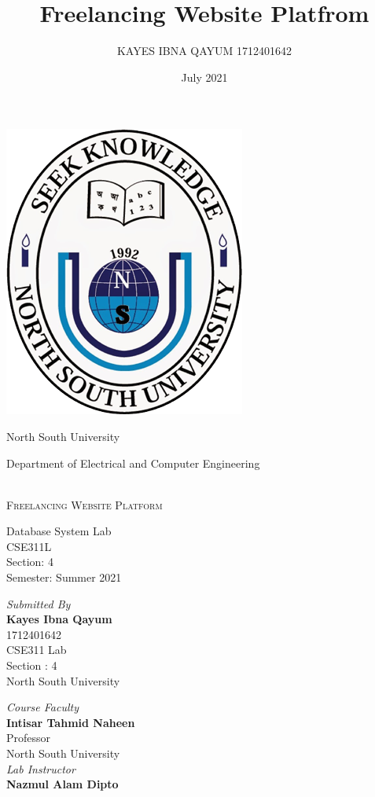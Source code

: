 \documentclass{article}
\title{Freelancing Website Platfrom}
\author{KAYES IBNA QAYUM 1712401642}
\date{July 2021}
\newcommand\hr{\par\vspace{-.5\ht\strutbox}\noindent\hrulefill\par}
\begin{document}
\begin{center}
    \includegraphics[scale=0.5]{nsu.png}
 
\begin{Huge}  
\bigskip
North South University 
\end{Huge}    

\begin{large}
Department of Electrical and Computer Engineering
\end{large}

\hr
\begin{huge}
\textsc{\\Freelancing Website Platform} 
\end{huge}
\hr

\begin{normalsize}
Database System Lab \\
CSE311L \\
Section: 4 \\
Semester: Summer 2021 
\end{normalsize}
\end{center}
\begin{Large} 
 \bigskip


\begin{multicols}{2}
\begin{flushleft}
\textit{Submitted By}\\
\textbf{Kayes Ibna Qayum} \\
1712401642 \\
\medskip
CSE311 Lab  \\
Section : 4 \\
North South University \\
\end{flushleft}
\bigskip

\begin{flushright}
\textit{Course Faculty}\\
\textbf{Intisar Tahmid Naheen}\\
Professor \\
North South University \\
\medskip
\textit{Lab Instructor}\\
\textbf{Nazmul Alam Dipto}
\end{flushright}
\end{multicols}
\end{Large}  
\end{document}
